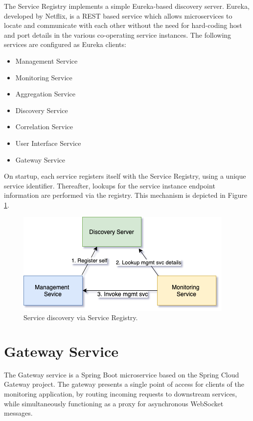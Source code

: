  The Service Registry implements a simple Eureka-based discovery server. Eureka, developed by Netflix, is a REST based service which allows microservices to locate and communicate with each other without the need for hard-coding host and port details in the various co-operating service instances. The following services are configured as Eureka clients:
 
 \begin{itemize}
 	\item Management Service
 	\item Monitoring Service
 	\item Aggregation Service
 	\item Discovery Service
 	\item Correlation Service
	\item User Interface Service
	\item Gateway Service
 \end{itemize}

On startup, each service registers itself with the Service Registry, using a unique service identifier. Thereafter, lookups for the service instance endpoint information are performed via the registry. This mechanism is depicted in Figure \ref{service_registry_scheme}.
 
\begin{figure}[H]
	\centering  
	\includegraphics[scale=0.8]{figures/impl/registry/eureka_discovery.png}
	\caption{Service discovery via Service Registry.}
	\label{service_registry_scheme}
\end{figure}

\newpage

 \section{Gateway Service}
 
 The Gateway service is a Spring Boot microservice based on the Spring Cloud Gateway project. The gateway presents a single point of access for clients of the monitoring application, by routing incoming requests to downstream services, while simultaneously functioning as a proxy for asynchronous WebSocket messages. 
 
